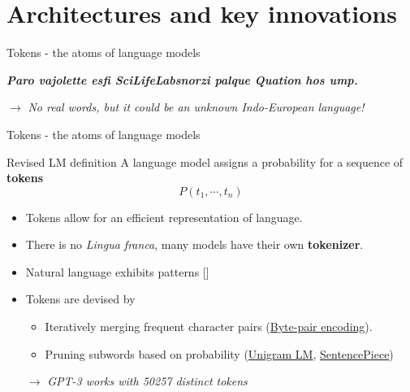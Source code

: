 \documentclass[10pt]{beamer}
\newcommand{\citeme}[1]{{\xspace\color{scAqua} \scriptsize [\cite{#1}]}}
\newcommand{\feature}[1]{{\color{scLime} \textbf{#1}}}
\newcommand{\remark}[1]{{\par \color{scGrape} \ensuremath{\rightarrow} \emph{#1}}}
\begin{document}

\section{Architectures and key innovations}


\begin{frame}{Tokens - the atoms of language models}
	\begin{center}
		\emph{\large \bfseries Paro vajolette esfi SciLifeLab\linebreak snorzi palque Quation hos ump.}
	\end{center}
  \remark{No real words, but it could be an unknown Indo-European language!}
\end{frame}

\begin{frame}{Tokens - the atoms of language models}
\begin{exampleblock}{Revised LM definition}
	A language model assigns a probability for a sequence of \feature{tokens}
	$$
	P(t_1, \cdots, t_{n})
	$$
\end{exampleblock}
\begin{itemize}
	\item Tokens allow for an efficient representation of language.
	\item There is no \emph{Lingua franca}, many models have their own \feature{tokenizer}. 
	\item Natural language exhibits patterns\citeme{Li1992,Piantadosi2014}
	\item Tokens are devised by 
			\begin{itemize}
			\item Iteratively merging frequent character pairs (\href{https://sebastianraschka.com/blog/2025/bpe-from-scratch.html}{Byte-pair encoding}).
			\item Pruning subwords based on probability (\href{https://medium.com/mti-technology/n-gram-language-model-b7c2fc322799}{Unigram LM}, \href{https://github.com/google/sentencepiece}{SentencePiece})
		\end{itemize}
	 \vspace{0.2cm} \par \remark{GPT-3 works with 50257 distinct tokens}
\end{itemize}
\end{frame}
\end{document}
